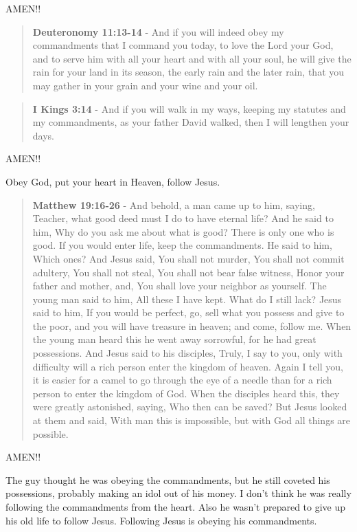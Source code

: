 \documentclass[11pt]{article}
\begin{document}
AMEN!!

\begin{quote}
\textbf{Deuteronomy 11:13-14} - And if you will indeed obey my commandments that I command you today, to love the Lord your God, and to serve him with all your heart and with all your soul, he will give the rain for your land in its season, the early rain and the later rain, that you may gather in your grain and your wine and your oil.
\end{quote}

\begin{quote}
\textbf{I Kings 3:14} - And if you will walk in my ways, keeping my statutes and my commandments, as your father David walked, then I will lengthen your days.
\end{quote}

AMEN!!

Obey God, put your heart in Heaven, follow Jesus.

\begin{quote}
\textbf{Matthew 19:16-26} - And behold, a man came up to him, saying, Teacher, what good deed must I do to have eternal life? And he said to him, Why do you ask me about what is good? There is only one who is good. If you would enter life, keep the commandments. He said to him, Which ones? And Jesus said, You shall not murder, You shall not commit adultery, You shall not steal, You shall not bear false witness, Honor your father and mother, and, You shall love your neighbor as yourself. The young man said to him, All these I have kept. What do I still lack? Jesus said to him, If you would be perfect, go, sell what you possess and give to the poor, and you will have treasure in heaven; and come, follow me. When the young man heard this he went away sorrowful, for he had great possessions. And Jesus said to his disciples, Truly, I say to you, only with difficulty will a rich person enter the kingdom of heaven. Again I tell you, it is easier for a camel to go through the eye of a needle than for a rich person to enter the kingdom of God. When the disciples heard this, they were greatly astonished, saying, Who then can be saved? But Jesus looked at them and said, With man this is impossible, but with God all things are possible.
\end{quote}

AMEN!!

The guy thought he was obeying the commandments, but he still coveted his possessions, probably making an idol out of his money.
I don't think he was really following the commandments from the heart.
Also he wasn't prepared to give up his old life to follow Jesus.
Following Jesus is obeying his commandments.
\end{document}
